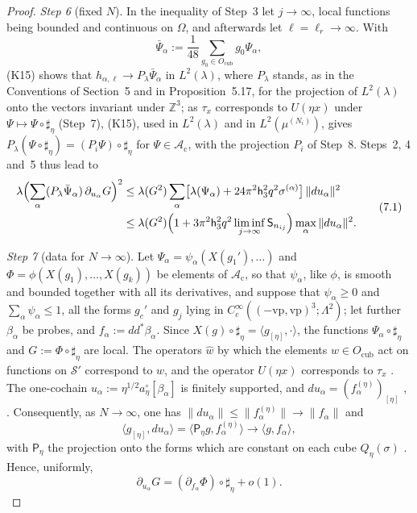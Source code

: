\documentclass[11pt]{amsart}
\theoremstyle{definition}
\begin{document}
\begin{proof}
\emph{Step 6} (fixed $N$).
In the inequality of Step~3 let $j\to\infty$, local functions being bounded and continuous on $\Omega$, and afterwards let $\ell=\ell_r\to\infty$.
With
\begin{equation*}
\bar\Psi_\alpha:=\frac1{48}\sum_{g_0\in O_{\mathrm{cub}}}g_0\Psi_\alpha,
\end{equation*}
(K15) shows that $h_{\alpha,\ell}\to P_\lambda\bar\Psi_\alpha$ in $L^2(\lambda)$, where $P_\lambda$ stands, as in the Conventions of Section~5 and in Proposition~5.17, for the projection of $L^2(\lambda)$ onto the vectors invariant under $\mathbb Z^3$;
as $\tau_x$ corresponds to $U(\eta x)$ under $\Psi\mapsto\Psi\circ\sharp_\eta$ (Step~7), (K15), used in $L^2(\lambda)$ and in $L^2(\mu^{(N_i)})$, gives $P_\lambda(\Psi\circ\sharp_\eta)=(P_i\Psi)\circ\sharp_\eta$ for $\Psi\in\mathcal A_{\mathrm c}$, with the projection $P_i$ of Step~8.
Steps~2, 4 and~5 thus lead to
\begin{equation}
\begin{split}
\lambda\Bigl(\sum_\alpha(P_\lambda\bar\Psi_\alpha)\,\partial_{u_\alpha}G\Bigr)^2
&\le\lambda(G^2)\sum_\alpha\bigl[\lambda(\Psi_\alpha)+24\pi^2\mathsf h_3^2q^2\sigma^{(\alpha)}\bigr]\,\|du_\alpha\|^2\\
&\le\lambda(G^2)\Bigl(1+3\pi^2\mathsf h_3^2q^2\liminf_{j\to\infty}\mathsf S_{n_{ij}}\Bigr)\max_\alpha\|du_\alpha\|^2.
\end{split}
\tag{7.1}\label{eq:weighted-lattice}
\end{equation}

\emph{Step 7} (data for $N\to\infty$).
Let $\Psi_\alpha=\psi_\alpha(X(g_1'),\dots)$ and $\Phi=\phi(X(g_1),\dots,X(g_k))$ be elements of $\mathcal A_{\mathrm c}$, so that $\psi_\alpha$, like $\phi$, is smooth and bounded together with all its derivatives, and suppose that $\psi_\alpha\ge0$ and $\sum_\alpha\psi_\alpha\le1$,
all the forms $g_c'$ and $g_j$ lying in $C_c^\infty((-\mathrm{vp},\mathrm{vp})^3;\Lambda^2)$;
let further $\beta_\alpha$ be probes, and $f_\alpha:=dd^*\beta_\alpha$.
Since $X(g)\circ\sharp_\eta=\langle g_{[\eta]},\cdot\rangle$, the functions $\Psi_\alpha\circ\sharp_\eta$ and $G:=\Phi\circ\sharp_\eta$ are local.
The operators $\hat w$ by which the elements $w\in O_{\mathrm{cub}}$ act on functions on $\mathcal S'$ correspond to $w$, and the operator $U(\eta x)$ corresponds to $\tau_x$ \cite[Lemma~12.6\,(a)]{QEDII}.
The one-cochain $u_\alpha:=\eta^{1/2}a^\circ_\eta[\beta_\alpha]$ is finitely supported, and $du_\alpha=(f_\alpha^{(\eta)})_{[\eta]}$ \cite[Proposition~47.1\,(b1), (b2$^\circ$)]{QEDIII}, \cite[Lemma~12.5\,(b)]{QEDII}.
Consequently, as $N\to\infty$, one has $\|du_\alpha\|\le\|f_\alpha^{(\eta)}\|\to\|f_\alpha\|$ and
\begin{equation*}
\langle g_{[\eta]},du_\alpha\rangle=\langle\mathsf P_\eta g,f_\alpha^{(\eta)}\rangle\to\langle g,f_\alpha\rangle,
\end{equation*}
with $\mathsf P_\eta$ the projection onto the forms which are constant on each cube $Q_\eta(\sigma)$ \cite[Proposition~47.1\,(b3)]{QEDIII}.
Hence, uniformly,
\begin{equation*}
\partial_{u_\alpha}G=(\partial_{f_\alpha}\Phi)\circ\sharp_\eta+o(1).
\end{equation*}


\end{proof}
\end{document}
